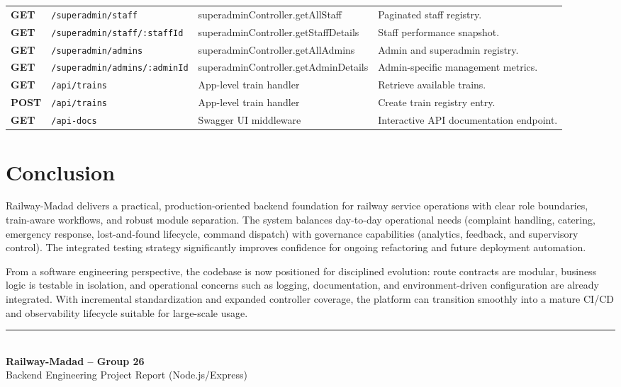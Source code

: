 \documentclass[12pt,a4paper]{report}
\renewcommand{\bottomrule}{\hline\hline}
\begin{document}
\begin{longtable}{>{\bfseries}p{} p{} p{} p{}}
GET & \texttt{/superadmin/staff} & superadminController.getAllStaff & Paginated staff registry. \\
GET & \texttt{/superadmin/staff/:staffId} & superadminController.getStaffDetails & Staff performance snapshot. \\
GET & \texttt{/superadmin/admins} & superadminController.getAllAdmins & Admin and superadmin registry. \\
GET & \texttt{/superadmin/admins/:adminId} & superadminController.getAdminDetails & Admin-specific management metrics. \\
GET & \texttt{/api/trains} & App-level train handler & Retrieve available trains. \\
POST & \texttt{/api/trains} & App-level train handler & Create train registry entry. \\
GET & \texttt{/api-docs} & Swagger UI middleware & Interactive API documentation endpoint. \\
\bottomrule
\end{longtable}

\chapter{Conclusion}

Railway-Madad delivers a practical, production-oriented backend foundation for railway service operations with clear role boundaries, train-aware workflows, and robust module separation. The system balances day-to-day operational needs (complaint handling, catering, emergency response, lost-and-found lifecycle, command dispatch) with governance capabilities (analytics, feedback, and supervisory control). The integrated testing strategy significantly improves confidence for ongoing refactoring and future deployment automation.

From a software engineering perspective, the codebase is now positioned for disciplined evolution: route contracts are modular, business logic is testable in isolation, and operational concerns such as logging, documentation, and environment-driven configuration are already integrated. With incremental standardization and expanded controller coverage, the platform can transition smoothly into a mature CI/CD and observability lifecycle suitable for large-scale usage.

\vfill
\begin{center}
\textcolor{Primary}{\rule{0.7\textwidth}{0.8pt}}\\[0.4em]
\textbf{Railway-Madad -- Group 26}\\
\small Backend Engineering Project Report (Node.js/Express)
\end{center}
\end{document}
